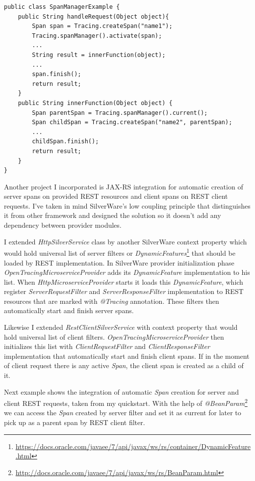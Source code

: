 \documentclass[12pt,oneside]{fithesis2}
\begin{document}
\begin{lstlisting}[caption = Usage of SpanManager, label = spanmanager, style=eclipse_java]
public class SpanManagerExample {
	public String handleRequest(Object object){
		Span span = Tracing.createSpan("name1");
		Tracing.spanManager().activate(span);
		...
		String result = innerFunction(object);
		...
		span.finish();
		return result;
	}
	public String innerFunction(Object object) {
		Span parentSpan = Tracing.spanManager().current();
		Span childSpan = Tracing.createSpan("name2", parentSpan);
		...
		childSpan.finish();
		return result;
	}
}
\end{lstlisting}

Another project I incorporated is JAX-RS integration for automatic creation of server spans on provided REST resources and client spans on REST client requests. I've taken in mind SilverWare's low coupling principle that distinguishes it from other framework and designed the solution so it doesn't add any dependency between provider modules.

I extended \textit{HttpSilverService} class by another SilverWare context property which would hold universal list of server filters or \textit{DynamicFeatures}\footnote{\url{https://docs.oracle.com/javaee/7/api/javax/ws/rs/container/DynamicFeature.html}} that should be loaded by REST implementation. In SilverWare provider initialization phase \textit{OpenTracingMicroserviceProvider} adds its \textit{DynamicFeature} implementation to his list. When \textit{HttpMicroserviceProvider} starts it loads this \textit{DynamicFeature}, which register \textit{ServerRequestFilter} and \textit{ServerResponseFilter} implementation to REST resources that are marked with \textit{@Tracing} annotation. These filters then automatically start and finish server spans. 

Likewise I extended \textit{RestClientSilverService} with context property that would hold universal list of client filters. \textit{OpenTracingMicroserviceProvider} then initializes this list with \textit{ClientRequestFilter} and \textit{ClientResponseFilter} implementation that automatically start and finish client spans. If in the moment of client request there is any active \textit{Span}, the client span is created as a child of it.

Next example shows the integration of automatic \textit{Span} creation for server and client REST requests, taken from my quickstart. With the help of \textit{@BeanParam}\footnote{\url{http://docs.oracle.com/javaee/7/api/javax/ws/rs/BeanParam.html}} we can access the \textit{Span} created by server filter and set it as current for later to pick up as a parent span by REST client filter.
\end{document}
